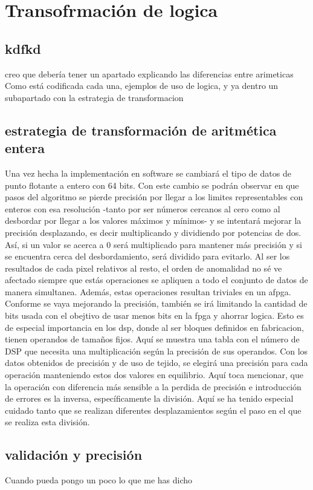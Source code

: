 \cleardoublepage
\chapter{Transofrmación de logica}
\label{makereference}
\section{kdfkd}
creo que debería tener un apartado explicando las diferencias entre arimeticas
Como está codificada cada una, ejemplos de uso de logica, y ya dentro un subapartado con la estrategia de transformacion

\section{estrategia de transformación de aritmética entera}
Una vez hecha la implementación en software se cambiará el tipo de datos de punto flotante a entero con 64 bits. Con este cambio se podrán observar en que pasos del algoritmo se pierde precisión por llegar a los limites representables con enteros con esa resolución -tanto por ser números cercanos al cero como al desbordar por llegar a los valores máximos y mínimos- y se intentará mejorar la precisión desplazando, es decir multiplicando y dividiendo por potencias de dos. Así, si un valor se acerca a 0 será multiplicado para mantener más precisión y si se encuentra cerca del desbordamiento, será dividido para evitarlo. Al ser los resultados de cada pixel relativos al resto, el orden de anomalidad no sé ve afectado siempre que estás operaciones se apliquen a todo el conjunto de datos de manera simultanea. Además, estas operaciones resultan triviales en un afpga.
Conforme se vaya mejorando la precisión, también se irá limitando la cantidad de bits usada con el obejtivo de usar menos bits en la fpga y ahorrar logica. Esto es de especial importancia en los dsp, donde al ser bloques definidos en fabricacion, tienen operandos de tamaños fijos. Aquí se muestra una tabla con el número de DSP que necesita una multiplicación según la precisión de sus operandos.
Con los datos obtenidos de precisión y de uso de tejido, se elegirá una precisión para cada operación manteniendo estos dos valores en equilibrio.
Aquí toca mencionar, que la operación con diferencia más sensible a la perdida de precisión e introducción de errores es la inversa, específicamente la división. Aquí se ha tenido especial cuidado tanto que se realizan diferentes desplazamientos según el paso en el que se realiza esta división.

\section{validación y precisión}
Cuando pueda pongo un poco lo que me has dicho